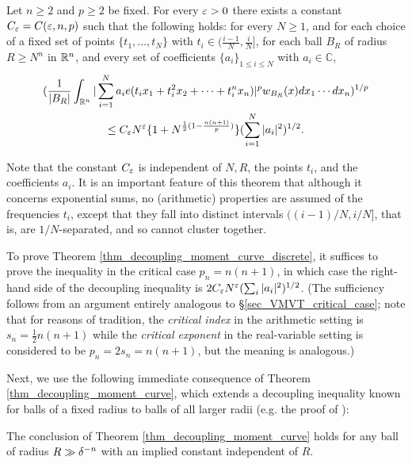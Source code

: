 \documentclass[brochure,english,12pt]{bourbaki}%
\newcommand{\C}{\mathbb{C}}
\begin{document}
\begin{theo}\label{thm_decoupling_moment_curve_discrete}
Let $n \geq 2$ and $p \geq 2$ be fixed. For every $\varepsilon>0$ there exists a constant $C_\varepsilon = C(\varepsilon,n,p)$ such that the following holds: for every $N \geq 1$,  and for each choice of a fixed set of points $\{t_1,\ldots, t_N\}$ with  $t_i \in (\frac{i-1}{N}, \frac{i}{N}]$,  for each ball $B_R$ of radius $R \geq N^n$ in $\mathbb{R}^n$, and every set of coefficients $\{a_i\}_{1\leq i \leq N}$ with $a_i \in \C$,
\begin{multline*}
 ( \frac{1}{|B_R|} \int_{\mathbb{R}^n} | \sum_{i=1}^N a_i e(t_i x_1 + t_i^2x_2 + \cdots + t_i^n x_n)|^p w_{B_R}(x) dx_1 \cdots dx_n)^{1/p} \\
 \leq C_\varepsilon N^\varepsilon\{1 + N^{\frac{1}{2}(1 - \frac{n(n+1)}{p}) }\}( \sum_{i=1}^N |a_i|^2)^{1/2}.
\end{multline*}
\end{theo}
Note that the constant $C_\varepsilon$ is independent of $N, R$, the points $t_i$, and the coefficients $a_i$.
It is an important feature of this theorem that although it concerns exponential sums, no (arithmetic) properties are assumed of the frequencies $t_i$, except that they fall into distinct intervals $((i-1)/N,i/N]$, that is, are $1/N$-separated, and so cannot cluster together. 



To prove Theorem \ref{thm_decoupling_moment_curve_discrete}, it suffices to prove the inequality 
  in the critical case $p_n=n(n+1)$, in which case the right-hand side of the decoupling inequality is $2C_\varepsilon N^\varepsilon (\sum_i |a_i|^2)^{1/2}$. (The sufficiency follows from an argument entirely analogous to \S \ref{sec_VMVT_critical_case}; note that for reasons of tradition, the \emph{critical index} in the arithmetic setting is $s_n=\frac{1}{2}n(n+1)$ while the \emph{critical exponent} in the real-variable setting is considered to be $p_n=2s_n=n(n+1)$, but the meaning is analogous.)
  

Next, we use the following immediate consequence of Theorem \ref{thm_decoupling_moment_curve}, which extends a decoupling inequality known for balls of a fixed radius to balls of all larger radii  (e.g.  the proof of \cite[Thm. 4.1]{BDG16}):
\begin{coro}\label{thm_decoupling_moment_curve_cor}
The conclusion of Theorem \ref{thm_decoupling_moment_curve} holds for any ball of radius $R \gg \delta^{-n}$ with an implied constant independent of $R$.
\end{coro}
\end{document}
